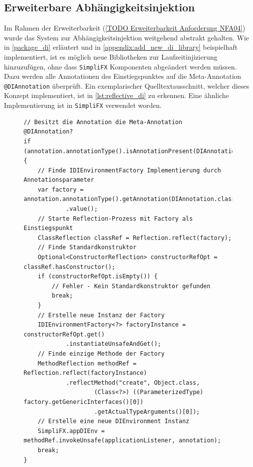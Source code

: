 \subsection{Erweiterbare Abhängigkeitsinjektion}
Im Rahmen der Erweiterbarkeit (\autoref{TODO Erweiterbarkeit Anforderung NFA04}) wurde das System zur Abhängigkeitsinjektion weitgehend abstrakt gehalten. Wie in \autoref{package_di} erläutert und in \autoref{appendix:add_new_di_library} beispielhaft implementiert, ist es möglich neue Bibliotheken zur Laufzeitinjizierung hinzuzufügen, ohne dass \texttt{SimpliFX} Komponenten abgeändert werden müssen. Dazu werden alle Annotationen des Einstiegspunktes auf die Meta-Annotation \texttt{@DIAnnotation} überprüft. Ein exemplarischer Quelltextausschnitt, welcher dieses Konzept implementiert, ist in \autoref{lst:reflective_di} zu erkennen. Eine ähnliche Implementierung ist in \texttt{SimpliFX} verwendet worden.
\begin{figure}[H]
	\centering
	\begin{lstlisting}[caption=Implementierung -- Abhängigkeitsinjektion., captionpos=b, label=lst:reflective_di, basicstyle={\scriptsize\ttfamily}]
// Besitzt die Annotation die Meta-Annotation @DIAnnotation?
if (annotation.annotationType().isAnnotationPresent(DIAnnotation.class)) {
	// Finde IDIEnvironmentFactory Implementierung durch Annotationsparameter
	var factory = annotation.annotationType().getAnnotation(DIAnnotation.class)
			.value();
	// Starte Reflection-Prozess mit Factory als Einstiegspunkt
	ClassReflection classRef = Reflection.reflect(factory);
	// Finde Standardkonstruktor
	Optional<ConstructorReflection> constructorRefOpt = classRef.hasConstructor();
	if (constructorRefOpt.isEmpty()) {
		// Fehler - Kein Standardkonstruktor gefunden
		break;
	}
	// Erstelle neue Instanz der Factory
	IDIEnvironmentFactory<?> factoryInstance = constructorRefOpt.get()
			.instantiateUnsafeAndGet();
	// Finde einzige Methode der Factory
	MethodReflection methodRef = Reflection.reflect(factoryInstance)
			.reflectMethod("create", Object.class, 
					(Class<?>) ((ParameterizedType) factory.getGenericInterfaces()[0])
					.getActualTypeArguments()[0]);
	// Erstelle eine neue DIEnvironment Instanz
	SimpliFX.appDIEnv = methodRef.invokeUnsafe(applicationListener, annotation);
	break;
}
	\end{lstlisting}
\end{figure}